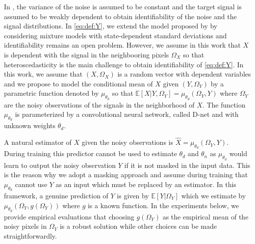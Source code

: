 \documentclass{article}
\begin{document}
In \cite{gassiat:lecorff:lehericy:2021}, the variance of the noise is assumed to be constant and the target signal is assumed to be weakly dependent to obtain identifiability of the noise and the signal  distributions. %
In \eqref{eq:def:Y}, we extend the model  proposed by \cite{gassiat:lecorff:lehericy:2021} by considering mixture models with  state-dependent standard deviations and identifiability remains an open problem. However, we assume in this work that $X$ is dependent with the signal in the neighbooring pixels $\Omega_X$ so that heteroscedasticity is the main challenge to obtain identifiability of \eqref{eq:def:Y}.
In this work, we assume that $(X,\Omega_X)$ is a random vector with dependent variables and we propose to model the conditional mean of $X$ given $(Y,\Omega_Y)$ by a parametric function denoted by $\mu_{\theta_d}$ so that $\mathbb{E}[X|Y,\Omega_Y] = \mu_{\theta_d}(\Omega_Y,Y)$ where $\Omega_Y$ are the noisy observations of the signals in the neighborhood of $X$. The function $ \mu_{\theta_d}$ is parameterized by a convolutional neural network, called D-net and with unknown weights $\theta_d$.

A natural estimator of $X$ given the noisy observations is $\widehat X = \mu_{\theta_d}(\Omega_Y,Y)$.
During training this predictor cannot be used to estimate $\theta_d$ and $\theta_n$ as $\mu_{\theta_d}$ would learn to output the noisy observation $Y$ if it is not masked in the input data.
This is the reason why we adopt a masking approach and assume during training that $\mu_{\theta_d}$ cannot use $Y$ as an input which must be replaced by an estimator.
In this framework, a genuine prediction of $Y$ is given by $\mathbb{E}[Y|\Omega_Y]$ which we estimate by $\mu_{\theta_d}(\Omega_Y,g(\Omega_Y))$ where $g$ is a known function. %
In the experiments below, we provide empirical evaluations that choosing $g(\Omega_Y)$ as the empirical mean of the noisy pixels in $\Omega_Y$ is a robust solution while other choices can be made straightforwardly.
\end{document}

